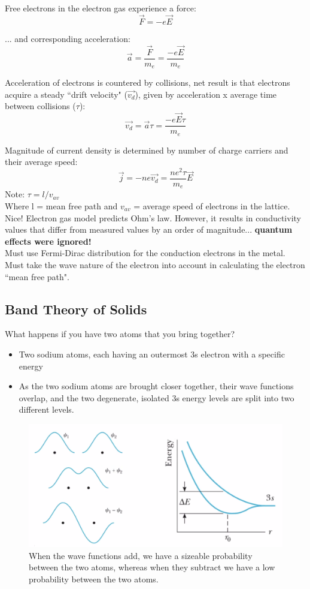 \documentclass[class=article,crop=false]{standalone}
\begin{document}
Free electrons in the electron gas experience a force:
$$ \vec{F} = -e \vec{E} $$

... and corresponding acceleration:
$$ \vec{a} = \frac{\vec{F}}{m_e} = \frac{-e \vec{E}}{m_e} $$

Acceleration of electrons is countered by collisions, net result is that electrons acquire a steady ``drift velocity" ($\vec{v_d}$), given by acceleration x average time between collisions ($\tau$):
$$ \vec{v_d} = \vec{a} \tau = \frac{-e\vec{E}\tau}{m_e} $$

Magnitude of current density is determined by number of charge carriers and their average speed:
$$ \vec{j} = -ne\vec{v_d} = \frac{ne^2\tau}{m_e}\vec{E} $$
Note: $\tau = l/v_{av}$ \\ 
Where l = mean free path and $v_{av}$ = average speed of electrons in the lattice.\\

Nice! Electron gas model predicts Ohm's law. However, it results in conductivity values that differ from measured values by an order of magnitude... \textbf{quantum effects were ignored!} \\

Must use Fermi-Dirac distribution for the conduction electrons in the metal.\\ 
Must take the wave nature of the electron into account in calculating the electron ``mean free path".\\

\subsection{Band Theory of Solids}

What happens if you have two atoms that you bring together?
\begin{itemize}
	\item Two sodium atoms, each having an outermost 3s electron with a specific energy
	\item As the two sodium atoms are brought closer together, their wave functions overlap, and the two degenerate, isolated 3s energy levels are split into two different levels.
\end{itemize}

\begin{figure}[h!]
	\centering
	\includegraphics[width=.8\linewidth]{./Images/add_or_subtract.png}
	\caption{When the wave functions add, we have a sizeable probability between the two atoms, whereas when they subtract we have a low probability between the two atoms.}
\end{figure}
\end{document}
